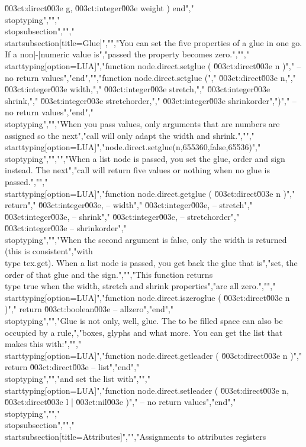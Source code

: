 \u003ct:direct\u003e g, \u003ct:integer\u003e weight ) end","\\stoptyping","","\\stopsubsection","","\\startsubsection[title={Glue}]","","You can set the five properties of a glue in one go. If a non|-|numeric value is","passed the property becomes zero.","","\\starttyping[option=LUA]","function node.direct.setglue ( \u003ct:direct\u003e n )","    -- no return values","end","","function node.direct.setglue (","    \u003ct:direct\u003e  n,","    \u003ct:integer\u003e width,","    \u003ct:integer\u003e stretch,","    \u003ct:integer\u003e shrink,","    \u003ct:integer\u003e stretchorder,","    \u003ct:integer\u003e shrinkorder",")","    -- no return values","end","\\stoptyping","","When you pass values, only arguments that are numbers are assigned so the next","call will only adapt the width and shrink.","","\\starttyping[option=LUA]","node.direct.setglue(n,655360,false,65536)","\\stoptyping","","","When a list node is passed, you set the glue, order and sign instead. The next","call will return five values or nothing when no glue is passed.","","\\starttyping[option=LUA]","function node.direct.getglue ( \u003ct:direct\u003e n )","    return","        \u003ct:integer\u003e, -- width","        \u003ct:integer\u003e, -- stretch","        \u003ct:integer\u003e, -- shrink","        \u003ct:integer\u003e, -- stretchorder","        \u003ct:integer\u003e  -- shrinkorder","\\stoptyping","","When the second argument is false, only the width is returned (this is consistent","with \\type {tex.get}). When a list node is passed, you get back the glue that is","set, the order of that glue and the sign.","","This function returns \\type {true} when the width, stretch and shrink properties","are all zero.","","\\starttyping[option=LUA]","function node.direct.iszeroglue ( \u003ct:direct\u003e n )","    return \u003ct:boolean\u003e -- allzero","end","\\stoptyping","","Glue is not only, well, glue. The to be filled space can also be occupied by a rule,","boxes, glyphs and what more. You can get the list that makes this with:","","\\starttyping[option=LUA]","function node.direct.getleader ( \u003ct:direct\u003e n )","    return \u003ct:direct\u003e -- list","end","\\stoptyping","","and set the list with","","\\starttyping[option=LUA]","function node.direct.setleader ( \u003ct:direct\u003e n, \u003ct:direct\u003e l | \u003ct:nil\u003e )","    -- no return values","end","\\stoptyping","","\\stopsubsection","","\\startsubsection[title={Attributes}]","","Assignments to attributes registers 